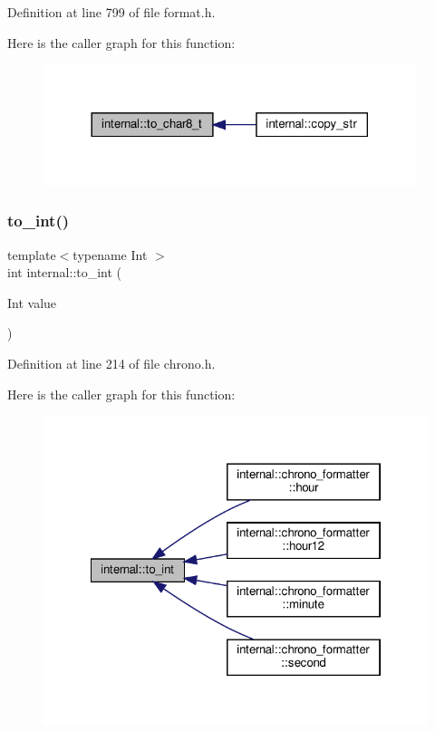 Definition at line 799 of file format.\+h.

Here is the caller graph for this function\+:
\nopagebreak
\begin{figure}[H]
\begin{center}
\leavevmode
\includegraphics[width=308pt]{namespaceinternal_aec25b0e61826253efb4ca1d710a60a0d_icgraph}
\end{center}
\end{figure}
\mbox{\label{namespaceinternal_a5f8d44f2e5d158dd370308bbbf35ac1c}} 
\subsubsection{\texorpdfstring{to\+\_\+int()}{to\_int()}}
{\footnotesize\ttfamily template$<$typename Int $>$ \\
int internal\+::to\+\_\+int (\begin{DoxyParamCaption}\item[{Int}]{value }\end{DoxyParamCaption})\hspace{0.3cm}{\ttfamily [inline]}}



Definition at line 214 of file chrono.\+h.

Here is the caller graph for this function\+:
\nopagebreak
\begin{figure}[H]
\begin{center}
\leavevmode
\includegraphics[width=322pt]{namespaceinternal_a5f8d44f2e5d158dd370308bbbf35ac1c_icgraph}
\end{center}
\end{figure}
\mbox{\label{namespaceinternal_a153fda3826e43649ab74f70396f9d5bc}} 
